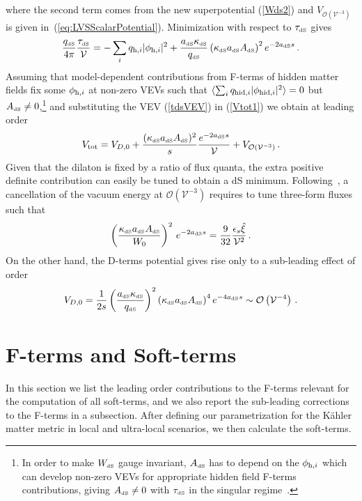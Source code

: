 \documentclass[12pt,a4paper]{book}
\def\dS{{\scriptscriptstyle \rm dS}}
\newcommand{\mc}{\mathcal}
\begin{document}
where the second term comes from the new superpotential (\ref{Wds2}) and $V_{\mc{O}(\mathcal{V}^{-3})}$ is given in~(\ref{eq:LVSScalarPotential}). Minimization with respect to $\tau_\dS$ gives
\begin{align}
\frac{q_\dS}{4\pi} \frac{\tau_\dS}{\mathcal{V}}=- \sum_i q_{{\rm h},i} |\phi_{{\rm h},i}|^2
+ \frac{a_\dS \kappa_\dS}{q_\dS}\left(\kappa_\dS a_\dS A_\dS\right)^2 e^{-2 a_\dS s}\,.
\label{tdsVEV}
\end{align}
Assuming that model-dependent contributions from F-terms of hidden matter fields fix some $\phi_{{\rm h}, i}$ at non-zero VEVs such that $\langle\sum_i q_{{\rm hid},i} |\phi_{{\rm hid},i}|^2\rangle = 0$ but $A_\dS\neq 0$,\footnote{In order to make $W_\dS$ gauge invariant, $A_\dS$ has to depend on the $\phi_{{\rm h},i}$ which can develop non-zero VEVs for appropriate hidden field F-terms contributions, giving $A_\dS\neq 0$ with $\tau_\dS$ in the singular regime~\cite{Cicoli:2012fh}.} and substituting the VEV (\ref{tdsVEV}) in (\ref{Vtot1}) we obtain at leading order
\begin{align}
V_{\rm tot} = V_{D,0}+ \frac{(\kappa_\dS a_\dS A_\dS)^2}{s} \frac{e^{-2 a_\dS s}}{\mathcal{V}} + V_{\mc{O}(\mathcal{V}^{-3})}\,.
\end{align}
Given that the dilaton is fixed by a ratio of flux quanta, the extra positive definite contribution can easily be tuned to obtain a dS minimum. Following~\cite{Cicoli:2012fh}, a cancellation of the vacuum energy at $\mc{O}(\mathcal{V}^{-3})$ requires to tune three-form fluxes such that
\begin{align}
\left(\frac{\kappa_\dS a_\dS A_\dS}{W_0}\right)^2 \,e^{-2 a_\dS s}
= \frac{9}{32} \frac{\epsilon_s \hat\xi}{\mathcal{V}^2}\,.
\label{CCconddS2}
\end{align}
On the other hand, the D-terms potential gives rise only to a sub-leading effect of order
\begin{align}
V_{D,0} =\frac{1}{2s} \left(\frac{a_\dS \kappa_\dS}{q_\dS}\right)^2\left(\kappa_\dS a_\dS A_\dS\right)^4 e^{-4 a_\dS s}\sim \mc{O}\left(\mathcal{V}^{-4}\right)\,.
\label{VD0ds2}
\end{align}

\section{F-terms and Soft-terms}
\label{sec:ftermsandsoftmasses}

In this section we list the leading order contributions to the F-terms relevant for the computation of all soft-terms, and we also report the sub-leading corrections to the F-terms in a subsection. After defining our parametrization for the K\"ahler matter metric in local and ultra-local scenarios, we then calculate the soft-terms.
\end{document}
